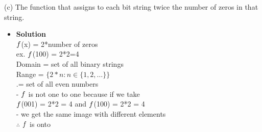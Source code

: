 \documentclass[11pt]{article}
\begin{document}
\begin{enumerate}

\begin{flushleft}
\end{flushleft}


\large (c) The function that assigns to each bit string twice the number of zeros in that string.\\

\begin{itemize}
\item \textbf{Solution}\\
\large $\mathnormal{f}$(x) = 2*number of zeros\\
\large ex. $\mathnormal{f}$(100) = 2*2=4\\
\large Domain = set of all binary strings\\
\large Range = $\{2*n \colon n\in \{1,2, \dots \}\}$\\
\large .\hspace{1.1cm}= set of all even numbers\\
\large - $\mathnormal{f}$ is not one to one because
if we take \\
\large $\mathnormal{f}$(001) = 2*2 = 4 and 
$\mathnormal{f}$(100) = 2*2 = 4\\
\large - we get the same image with different elements\\
\large $\therefore$ $\mathnormal{f}$ is onto\\

\end {itemize}
\end {enumerate}
\end{document}
